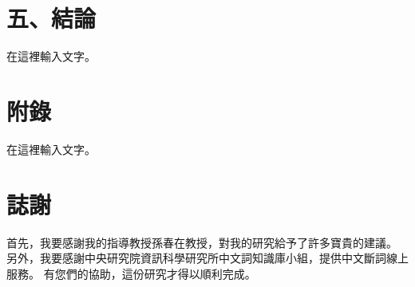 \documentclass[letterpaper, 10pt, conference]{ieeeconf}   %
\begin{document}
\begin{CJK}{UTF8}{bsmi}
\section*{五、結論}

在這裡輸入文字。

\addtolength{\textheight}{-12cm}  %


\section*{附錄}

在這裡輸入文字。

\section*{誌謝}

首先，我要感謝我的指導教授孫春在教授，對我的研究給予了許多寶貴的建議。
另外，我要感謝中央研究院資訊科學研究所中文詞知識庫小組，提供中文斷詞線上服務。
有您們的協助，這份研究才得以順利完成。





\end{CJK}
\end{document}
